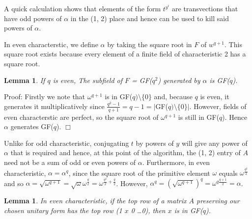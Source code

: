 \documentclass[12pt]{report}
\newtheorem{lemma}[definition]{Lemma}
\newenvironment{proof}{\normalsize {\sc Proof}:}{{\hfill $\Box$ \\}}
\begin{document}
A quick calculation shows that elements of the form $t^{y^i}$ are transvections that have odd powers of $\alpha$ in the (1, 2) place and hence can be used to kill said powers of $\alpha$.

In even characterstic, we define $\alpha$ by taking the square root in $F$ of $w^{q+1}$. This square root exists because every element of a finite field of characteristic 2 has a square root.

\begin{lemma}
If $q$ is even, The subfield of $F$ = GF($q^2$) generated by $\alpha$ is GF($q$).
\end{lemma}

\begin{proof}
Firstly we note that $\omega^{q+1}$ is in GF($q) \setminus \{0\}$ and, because $q$ is even, it generates it multiplicatively since $\frac{q^2 - 1}{q+1} = q - 1 = |$GF($q) \setminus \{0\}|$. However, fields of even characterstic are perfect, so the square root of $\omega^{q+1}$ is still in GF($q$). Hence $\alpha$ generates GF($q$).
\end{proof}

Unlike for odd characteristic, conjugating $t$ by powers of $y$ will give any power of $\alpha$ that is required and hence, at this point of the algorithm, the (1, 2) entry of $A$ need not be a sum of odd or even powers of $\alpha$. Furthermore, in even characteristic, $\alpha = \alpha^q$, since the square root of the primitive element $\omega$ equals $\omega^{\frac{q^2}{2}}$ and so $\alpha = \sqrt{\omega^{q+1}} = \sqrt{\omega}\omega^{\frac{q}{2}} = \omega^{\frac{q^2}{2} + \frac{q}{2}}$. However, $\alpha^q = (\sqrt{\omega^{q+1}})^q = \omega^{q \frac{q+1}{2}} = \alpha$.

\begin{lemma}
In even characteristic, if the top row of a matrix $A$ preserving our chosen unitary form has the top row (1 $x$ 0 \ldots 0), then $x$ is in GF($q$).
\end{lemma}
\end{document}
